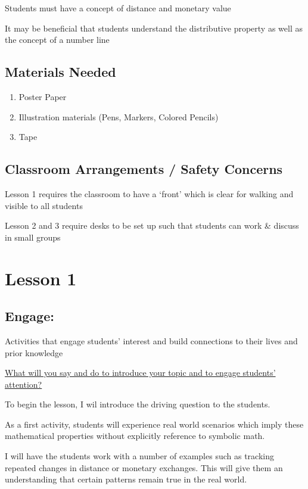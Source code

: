 \documentclass{notes}
\begin{document}
Students must have a concept of distance and monetary value

It may be beneficial that students understand the distributive property as well as the concept of a number line

\subsection*{Materials Needed}

\begin{enumerate}
    \item Poster Paper
    \item Illustration materials (Pens, Markers, Colored Pencils)
    \item Tape
\end{enumerate}

\subsection*{Classroom Arrangements / Safety Concerns}

Lesson 1 requires the classroom to have a `front' which is clear for walking and visible to all students

Lesson 2 and 3 require desks to be set up such that students can work \& discuss in small groups

\section{Lesson 1}

\subsection{Engage:}

Activities that engage students’ interest and build connections to their lives and prior knowledge

\ul{What will you say and do to introduce your topic and to engage students’ attention?}

To begin the lesson, I wil introduce the driving question to the students.

As a first activity, students will experience real world scenarios which imply these mathematical properties without explicitly reference to symbolic math.

I will have the students work with a number of examples such as tracking repeated changes in distance or monetary exchanges. This will give them an understanding that certain patterns remain true in the real world.
\end{document}
